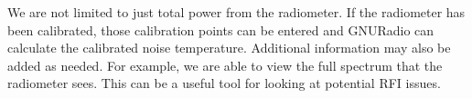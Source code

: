 We are not limited to just total power from the radiometer.  If the radiometer has been calibrated, those calibration points can be entered and GNURadio can calculate the calibrated noise temperature.  Additional information may also be added as needed.  For example, we are able to view the full spectrum that the radiometer sees.  This can be a useful tool for looking at potential RFI issues.  


